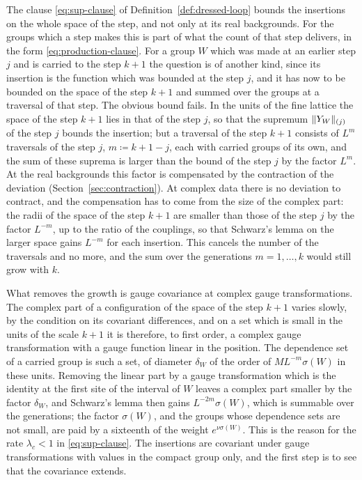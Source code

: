 \documentclass[11pt]{preprint}
\DeclarePairedDelimiter{\norm}{\lVert}{\rVert}
\numberwithin{equation}{section}
\theoremstyle{definition}
\theoremstyle{remark}
\theoremstyle{plain}
\begin{document}
The clause \eqref{eq:sup-clause} of Definition~\ref{def:dressed-loop} bounds the insertions on the whole space of the step, and not only at its real backgrounds. For the groups which a step makes this is part of what the count of that step delivers, in the form \eqref{eq:production-clause}. For a group $W$ which was made at an earlier step $j$ and is carried to the step $k + 1$ the question is of another kind, since its insertion is the function which was bounded at the step $j$, and it has now to be bounded on the space of the step $k + 1$ and summed over the groups at a traversal of that step. The obvious bound fails. In the units of the fine lattice the space of the step $k + 1$ lies in that of the step $j$, so that the supremum $\norm{Y_W}_{(j)}$ of the step $j$ bounds the insertion; but a traversal of the step $k + 1$ consists of $L^m$ traversals of the step $j$, $m \coloneqq k + 1 - j$, each with carried groups of its own, and the sum of these suprema is larger than the bound of the step $j$ by the factor $L^m$. At the real backgrounds this factor is compensated by the contraction of the deviation (Section~\ref{sec:contraction}). At complex data there is no deviation to contract, and the compensation has to come from the size of the complex part: the radii of the space of the step $k + 1$ are smaller than those of the step $j$ by the factor $L^{-m}$, up to the ratio of the couplings, so that Schwarz's lemma on the larger space gains $L^{-m}$ for each insertion. This cancels the number of the traversals and no more, and the sum over the generations $m = 1, \dots, k$ would still grow with $k$.

What removes the growth is gauge covariance at complex gauge transformations. The complex part of a configuration of the space of the step $k + 1$ varies slowly, by the condition on its covariant differences, and on a set which is small in the units of the scale $k + 1$ it is therefore, to first order, a complex gauge transformation with a gauge function linear in the position. The dependence set of a carried group is such a set, of diameter $\delta_W$ of the order of $ML^{-m}\sigma(W)$ in these units. Removing the linear part by a gauge transformation which is the identity at the first site of the interval of $W$ leaves a complex part smaller by the factor $\delta_W$, and Schwarz's lemma then gains $L^{-2m}\sigma(W)$, which is summable over the generations; the factor $\sigma(W)$, and the groups whose dependence sets are not small, are paid by a sixteenth of the weight $e^{\nu\sigma(W)}$. This is the reason for the rate $\lambda_c < 1$ in \eqref{eq:sup-clause}. The insertions are covariant under gauge transformations with values in the compact group only, and the first step is to see that the covariance extends.
\end{document}
